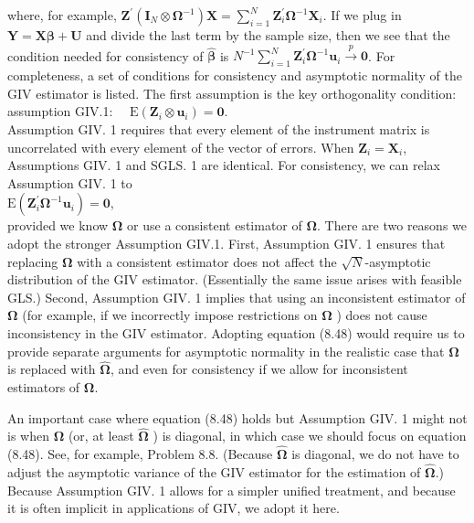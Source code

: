 \documentclass[10pt]{article}
\begin{document}
where, for example, $\mathbf{Z}^{\prime}\left(\mathbf{I}_{N} \otimes \boldsymbol{\Omega}^{-1}\right) \mathbf{X}=\sum_{i=1}^{N} \mathbf{Z}_{i}^{\prime} \boldsymbol{\Omega}^{-1} \mathbf{X}_{i}$. If we plug in $\mathbf{Y}=\mathbf{X} \boldsymbol{\beta}+\mathbf{U}$ and divide the last term by the sample size, then we see that the condition needed for consistency of $\hat{\boldsymbol{\beta}}$ is $N^{-1} \sum_{i=1}^{N} \mathbf{Z}_{i}^{\prime} \boldsymbol{\Omega}^{-1} \mathbf{u}_{i} \xrightarrow{p} \mathbf{0}$. For completeness, a set of conditions for consistency and asymptotic normality of the GIV estimator is listed. The first assumption is the key orthogonality condition:\\
assumption GIV.1: $\quad \mathrm{E}\left(\mathbf{Z}_{i} \otimes \mathbf{u}_{i}\right)=\mathbf{0}$.\\
Assumption GIV. 1 requires that every element of the instrument matrix is uncorrelated with every element of the vector of errors. When $\mathbf{Z}_{i}=\mathbf{X}_{i}$, Assumptions GIV. 1 and SGLS. 1 are identical. For consistency, we can relax Assumption GIV. 1 to\\
$\mathrm{E}\left(\mathbf{Z}_{i}^{\prime} \boldsymbol{\Omega}^{-1} \mathbf{u}_{i}\right)=\mathbf{0}$,\\
provided we know $\boldsymbol{\Omega}$ or use a consistent estimator of $\boldsymbol{\Omega}$. There are two reasons we adopt the stronger Assumption GIV.1. First, Assumption GIV. 1 ensures that replacing $\boldsymbol{\Omega}$ with a consistent estimator does not affect the $\sqrt{N}$-asymptotic distribution of the GIV estimator. (Essentially the same issue arises with feasible GLS.) Second, Assumption GIV. 1 implies that using an inconsistent estimator of $\boldsymbol{\Omega}$ (for example, if we incorrectly impose restrictions on $\boldsymbol{\Omega}$ ) does not cause inconsistency in the GIV estimator. Adopting equation (8.48) would require us to provide separate arguments for asymptotic normality in the realistic case that $\boldsymbol{\Omega}$ is replaced with $\hat{\boldsymbol{\Omega}}$, and even for consistency if we allow for inconsistent estimators of $\boldsymbol{\Omega}$.

An important case where equation (8.48) holds but Assumption GIV. 1 might not is when $\boldsymbol{\Omega}$ (or, at least $\hat{\boldsymbol{\Omega}}$ ) is diagonal, in which case we should focus on equation (8.48). See, for example, Problem 8.8. (Because $\hat{\boldsymbol{\Omega}}$ is diagonal, we do not have to adjust the asymptotic variance of the GIV estimator for the estimation of $\hat{\boldsymbol{\Omega}}$.) Because Assumption GIV. 1 allows for a simpler unified treatment, and because it is often implicit in applications of GIV, we adopt it here.
\end{document}
